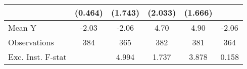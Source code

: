 {\begin{tabular}{l*{5}{c}}
            &     (0.464)         &     (1.743)         &     (2.033)         &     (1.666)         &                     \\
\midrule
Mean Y      &       -2.03         &       -2.06         &        4.70         &        4.90         &       -2.06         \\
Observations&         384         &         365         &         382         &         381         &         364         \\
Exc. Inst. F-stat&                     &       4.994         &       1.737         &       3.878         &       0.158         \\
\bottomrule
\end{tabular}
}
